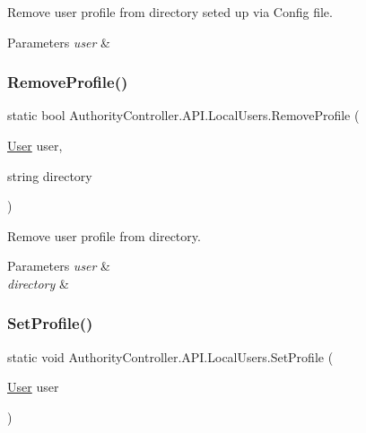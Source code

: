 Remove user profile from directory seted up via Config file. 


\begin{DoxyParams}{Parameters}
{\em user} & \\
\hline
\end{DoxyParams}
\mbox{\label{class_authority_controller_1_1_a_p_i_1_1_local_users_ae02de90abedf4b3e97478dc6270d833d}} 
\subsubsection{\texorpdfstring{Remove\+Profile()}{RemoveProfile()}\hspace{0.1cm}{\footnotesize\ttfamily [2/2]}}
{\footnotesize\ttfamily static bool Authority\+Controller.\+A\+P\+I.\+Local\+Users.\+Remove\+Profile (\begin{DoxyParamCaption}\item[{\mbox{\hyperlink{class_authority_controller_1_1_data_1_1_personal_1_1_user}{User}}}]{user,  }\item[{string}]{directory }\end{DoxyParamCaption})\hspace{0.3cm}{\ttfamily [static]}}



Remove user profile from directory. 


\begin{DoxyParams}{Parameters}
{\em user} & \\
\hline
{\em directory} & \\
\hline
\end{DoxyParams}
\mbox{\label{class_authority_controller_1_1_a_p_i_1_1_local_users_ac9295cdceab3bc5a0363a435cbdf3f03}} 
\subsubsection{\texorpdfstring{Set\+Profile()}{SetProfile()}\hspace{0.1cm}{\footnotesize\ttfamily [1/2]}}
{\footnotesize\ttfamily static void Authority\+Controller.\+A\+P\+I.\+Local\+Users.\+Set\+Profile (\begin{DoxyParamCaption}\item[{\mbox{\hyperlink{class_authority_controller_1_1_data_1_1_personal_1_1_user}{User}}}]{user }\end{DoxyParamCaption})\hspace{0.3cm}{\ttfamily [static]}}



